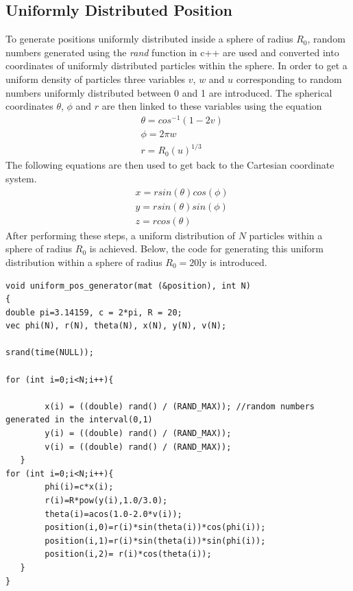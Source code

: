 
\subsection{Uniformly Distributed Position}
To generate positions uniformly distributed inside a sphere of radius $R_0$, random numbers generated using the \textit{rand} function in c++ are used and converted into coordinates of uniformly distributed particles within the sphere. 
In order to get a uniform density of particles three variables $v$, $w$ and $u$ corresponding to random numbers uniformly distributed between 0 and 1 are introduced.
The spherical coordinates $\theta$, $\phi$ and $r$ are then linked to these variables using the equation
\begin{align*}
	&\theta = cos^{-1}(1-2v)
	\\
	&\phi = 2\pi w
	\\	
	&r = R_0 (u)^{1/3}
\end{align*}                                            
The following equations are then used to get back to the Cartesian coordinate system.
\begin{align*}
	&x= rsin(\theta)cos(\phi)
	\\
    &y = r sin(\theta) sin(\phi)
    \\
    &z = r cos(\theta)
\end{align*}
After performing these steps, a uniform distribution of $N$ particles within a sphere of radius $R_0$ is achieved.
Below, the code for generating this uniform distribution within a sphere of radius $R_0 = 20 \text{ly}$ is introduced.
\begin{lstlisting}
void uniform_pos_generator(mat (&position), int N)
{
double pi=3.14159, c = 2*pi, R = 20;
vec phi(N), r(N), theta(N), x(N), y(N), v(N);

srand(time(NULL));

for (int i=0;i<N;i++){

        x(i) = ((double) rand() / (RAND_MAX)); //random numbers generated in the interval(0,1)
        y(i) = ((double) rand() / (RAND_MAX));
        v(i) = ((double) rand() / (RAND_MAX));
   }
for (int i=0;i<N;i++){
        phi(i)=c*x(i);
        r(i)=R*pow(y(i),1.0/3.0);
        theta(i)=acos(1.0-2.0*v(i));
        position(i,0)=r(i)*sin(theta(i))*cos(phi(i));
        position(i,1)=r(i)*sin(theta(i))*sin(phi(i));
        position(i,2)= r(i)*cos(theta(i));
   }
}
\end{lstlisting}
